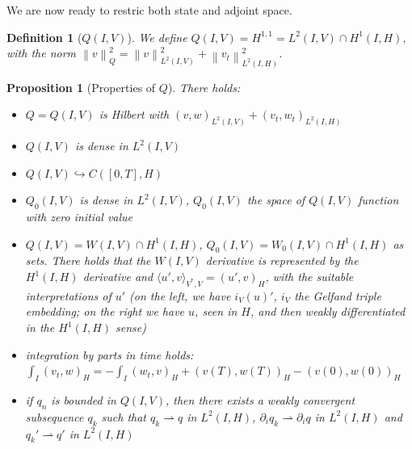 \documentclass[english,a4paper,12pt,oneside]{scrbook}
\theoremstyle{break}
\newtheorem{defn}[equation]{Definition}
\newtheorem{prop}[equation]{Proposition}
\theoremstyle{remark}
\newcommand{\norm}[1]{\left\lVert#1\right\rVert}
\newcommand{\emb}{\hookrightarrow}
\newcommand{\weakc}{\rightharpoonup}
\begin{document}
We are now ready to restric both state and adjoint space.

\begin{defn}[$Q(I,V)$]
We define $Q(I,V)=H^{1,1}=L^2(I,V)\cap H^1(I,H)$, with the norm $\norm{v}_Q^2=\norm{v}_{L^2(I,V)}^2 + \norm{v_t}_{L^2(I,H)}^2$.
\end{defn}

\begin{prop}[Properties of $Q$]
\label{prop:Q}
There holds:
\begin{itemize}
	\item $Q=Q(I,V)$ is Hilbert with $(v,w)_{L^2(I,V)} + (v_t,w_t)_{L^2(I,H)}$ 
	\item $Q(I,V)$ is dense in $L^2(I,V)$
	\item $Q(I,V)\emb C([0,T],H)$
	\item $Q_0(I,V)$ is dense in $L^2(I,V)$, $Q_0(I,V)$ the space of $Q(I,V)$ function with zero initial value
	\item $Q(I,V) = W(I,V)\cap H^1(I,H)$, $Q_0(I,V) =  W_0(I,V)\cap H^1(I,H)$ as sets. There holds that the $W(I,V)$ derivative is represented by the $H^1(I,H)$ derivative and $\langle u', v\rangle_{V^*,V} = (u',v)_H$, with the suitable interpretations of $u'$ (on the left, we have $i_V(u)'$, $i_V$ the Gelfand triple embedding; on the right we have $u$, seen in $H$, and then weakly differentiated in the $H^1(I,H)$ sense)
	\item integration by parts in time holds: $\int_I(v_t,w)_H = -\int_I(w_t,v)_H +(v(T),w(T))_H-(v(0),w(0))_H$
	\item if $q_n$ is bounded in $Q(I,V)$, then there exists a weakly convergent subsequence $q_k$ such that $q_k\weakc q$ in $L^2(I,H)$, $\partial_i q_k\weakc \partial_i q$ in $L^2(I,H)$ and $q_k'\weakc q'$ in $L^2(I,H)$
\end{itemize}
\end{prop}
\end{document}
